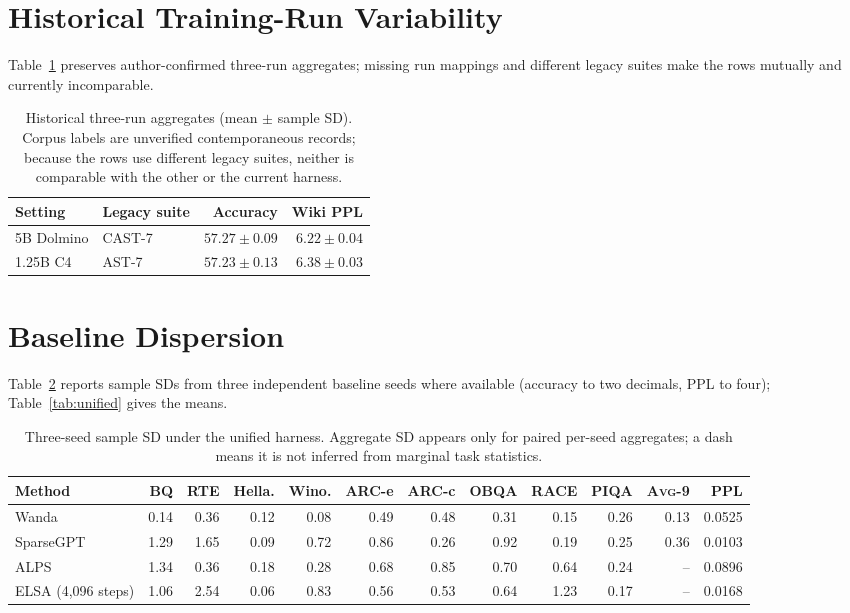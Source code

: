 \documentclass{article}
\newcommand{\taskavg}{\textsc{Avg}-9}
\begin{document}
\section{Historical Training-Run Variability}
\label{app:history}
Table~\ref{tab:historical} preserves author-confirmed three-run aggregates;
missing run mappings and different legacy suites make the rows mutually and
currently incomparable.
\begin{table}[H]
\centering
\caption{Historical three-run aggregates (mean $\pm$ sample SD). Corpus labels
are unverified contemporaneous records; because the rows use different legacy
suites, neither is comparable with the other or the current harness.}
\label{tab:historical}
\small
\begin{tabular}{llrr}
\toprule
Setting & Legacy suite & Accuracy & Wiki PPL \\
\midrule
5B Dolmino & CAST-7 & $57.27\pm0.09$ & $6.22\pm0.04$ \\
1.25B C4 & AST-7 & $57.23\pm0.13$ & $6.38\pm0.03$ \\
\bottomrule
\end{tabular}
\end{table}

\section{Baseline Dispersion}
\label{app:dispersion}
Table~\ref{tab:dispersion} reports sample SDs from three independent baseline
seeds where available (accuracy to two decimals, PPL to four); Table~\ref{tab:unified}
gives the means.
\begin{table}[H]
\centering
\caption{Three-seed sample SD under the unified harness. Aggregate SD appears
only for paired per-seed aggregates; a dash means it is not inferred from
marginal task statistics.}
\label{tab:dispersion}
\setlength{\tabcolsep}{2.4pt}
\small
\begin{tabular*}{\textwidth}{@{\extracolsep{\fill}}lrrrrrrrrrrr}
\toprule
Method & BQ & RTE & Hella. & Wino. & ARC-e & ARC-c & OBQA & RACE & PIQA & \taskavg & PPL \\
\midrule
Wanda & 0.14 & 0.36 & 0.12 & 0.08 & 0.49 & 0.48 & 0.31 & 0.15 & 0.26 & 0.13 & 0.0525 \\
SparseGPT & 1.29 & 1.65 & 0.09 & 0.72 & 0.86 & 0.26 & 0.92 & 0.19 & 0.25 & 0.36 & 0.0103 \\
ALPS & 1.34 & 0.36 & 0.18 & 0.28 & 0.68 & 0.85 & 0.70 & 0.64 & 0.24 & -- & 0.0896 \\
ELSA (4,096 steps) & 1.06 & 2.54 & 0.06 & 0.83 & 0.56 & 0.53 & 0.64 & 1.23 & 0.17 & -- & 0.0168 \\
\bottomrule
\end{tabular*}
\end{table}
\end{document}
